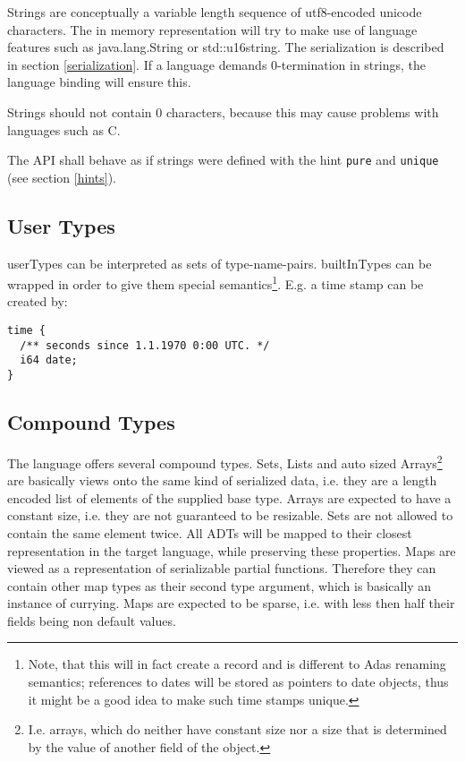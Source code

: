 Strings are conceptually a variable length sequence of utf8-encoded unicode characters. The in memory representation will try to make use of language features such as java.lang.String or std::u16string. The serialization is described in section \ref{serialization}. If a language demands 0-termination in strings, the language binding will ensure this.

Strings should not contain 0 characters, because this may cause problems with languages such as C.

The API shall behave as if strings were defined with the hint \texttt{pure} and \texttt{unique} (see section \ref{hints}).


\subsection{User Types}

\Glspl{userType} can be interpreted as sets of type-name-pairs. \Glspl{builtInType} can be wrapped in order to give them special semantics\footnote{Note, that this will in fact create a record and is different to Adas renaming semantics; references to dates will be stored as pointers to date objects, thus it might be a good idea to make such time stamps unique.}. E.g. a time stamp can be created by:
\begin{lstlisting}[label=timeExample,caption=Time,language=skill]
time {
  /** seconds since 1.1.1970 0:00 UTC. */
  i64 date;
}
\end{lstlisting}


\subsection{Compound Types}

The language offers several compound types. Sets, Lists and auto sized Arrays\footnote{I.e. arrays, which do neither have constant size nor a size that is determined by the value of another field of the object.} are basically views onto the same kind of serialized data, i.e. they are a length encoded list of elements of the supplied base type. Arrays are expected to have a constant size, i.e. they are not guaranteed to be resizable. Sets are not allowed to contain the same element twice.
All ADTs will be mapped to their closest representation in the target language, while preserving these properties.
Maps are viewed as a representation of serializable partial functions. Therefore they can contain other map types as their second type argument, which is basically an instance of currying. Maps are expected to be sparse, i.e. with less then half their fields being non default values.


